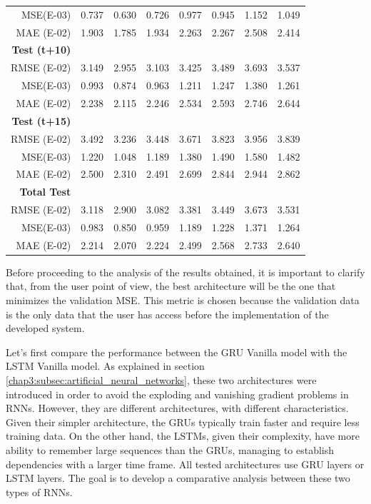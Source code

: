 \begin{table}[ht]
{\begin{tabular}{r|c|cc|cccc}
    MSE(E-03) & 0.737 & 0.630 & 0.726 & 0.977 & 0.945 & 1.152 & 1.049 \\
    MAE (E-02) & 1.903 & 1.785 & 1.934 & 2.263 & 2.267 & 2.508 & 2.414 \\
    \textbf{Test (t+10)} &   &   &   &   &   &   &  \\
    RMSE (E-02) & 3.149 & 2.955 & 3.103 & 3.425 & 3.489 & 3.693 & 3.537 \\
    MSE(E-03) & 0.993 & 0.874 & 0.963 & 1.211 & 1.247 & 1.380 & 1.261 \\
    MAE (E-02) & 2.238 & 2.115 & 2.246 & 2.534 & 2.593 & 2.746 & 2.644 \\
    \textbf{Test (t+15)} &   &   &   &   &   &   &  \\
    RMSE (E-02) & 3.492 & 3.236 & 3.448 & 3.671 & 3.823 & 3.956 & 3.839 \\
    MSE(E-03) & 1.220 & 1.048 & 1.189 & 1.380 & 1.490 & 1.580 & 1.482 \\
    MAE (E-02) & 2.500 & 2.310 & 2.491 & 2.699 & 2.844 & 2.944 & 2.862 \\
    \midrule
    \textbf{Total Test} &   &   &   &   &   &   &  \\
    RMSE (E-02) & 3.118 & 2.900 & 3.082 & 3.381 & 3.449 & 3.673 & 3.531 \\
    MSE(E-03) & 0.983 & 0.850 & 0.959 & 1.189 & 1.228 & 1.371 & 1.264 \\
    MAE (E-02) & 2.214 & 2.070 & 2.224 & 2.499 & 2.568 & 2.733 & 2.640 \\
    \end{tabular}%
    }
  \label{valres}%
\end{table}%


Before proceeding to the analysis of the results obtained, it is important to clarify that, from the user point of view, the best architecture will be the one that minimizes the validation \ac{MSE}. This metric is chosen because the validation data is the only data that the user has access before the implementation of the developed system.

Let's first compare the performance between the \ac{GRU} Vanilla model with the \ac{LSTM} Vanilla model. As explained in section \ref{chap3:subsec:artificial_neural_networks}, these two architectures were introduced in order to avoid the exploding and vanishing gradient problems in \ac{RNN}s. However, they are different architectures, with different characteristics. Given their simpler architecture, the \ac{GRU}s typically train faster and require less training data. On the other hand, the \ac{LSTM}s, given their complexity, have more ability to remember large sequences than the \ac{GRU}s, managing to establish dependencies with a larger time frame. All tested architectures use \ac{GRU} layers or \ac{LSTM} layers. The goal is to develop a comparative analysis between these two types of \ac{RNN}s.

